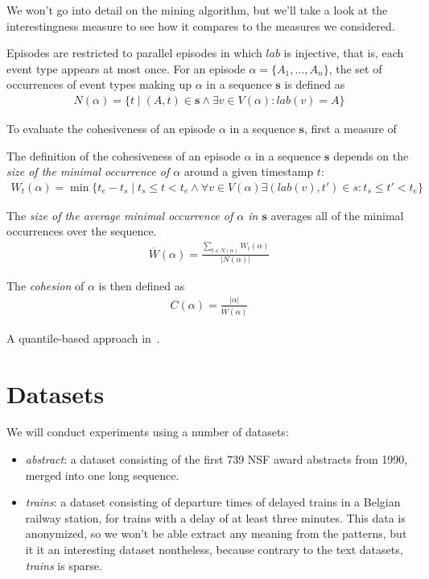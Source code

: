 We won't go into detail on the mining algorithm, but we'll take a look at the interestingness measure to see how it compares to the measures we considered.

Episodes are restricted to parallel episodes in which $ lab $ is injective, that is, each event type appears at most once. For an episode $ \alpha = \{ A_1, \ldots, A_n \} $, the set of occurrences of event types making up $ \alpha $ in a sequence $ \boldsymbol{s} $ is defined as
\begin{align*}
N(\alpha) = \{ t \mid (A, t) \in \boldsymbol{s} \wedge \exists v \in V(\alpha): lab(v) = A \}
\end{align*}


To evaluate the cohesiveness of an episode $ \alpha $ in a sequence $ \boldsymbol{s} $, first a measure of 

The definition of the cohesiveness of an episode $ \alpha $ in a sequence $ \boldsymbol{s} $ depends on the \emph{size of the minimal occurrence of $ \alpha $} around a given timestamp $ t $:
\begin{align*}
W_t(\alpha) = \min\{ t_e - t_s \mid t_s \leq t < t_e \wedge \forall v \in V(\alpha) \exists (lab(v), t') \in s : t_s \leq t' < t_e \}
\end{align*}

The \emph{size of the average minimal occurrence of $ \alpha $ in $ \boldsymbol{s} $} averages all of the minimal occurrences over the sequence.
\begin{align*}
\overline{W}(\alpha) = \frac{\sum_{t \in N(\alpha)} W_t(\alpha)}{| N(\alpha) |}
\end{align*}

The \emph{cohesion} of $ \alpha $ is then defined as
\begin{align*}
C(\alpha) = \frac{| \alpha |}{\overline{W}(\alpha)}
\end{align*}

A quantile-based approach in~\citep{feremans2018mining}.

\section{Datasets}

We will conduct experiments using a number of datasets:

\begin{itemize}
\item \emph{abstract}: a dataset consisting of the first 739 NSF award abstracts from 1990, merged into one long sequence.
\item \emph{trains}: a dataset consisting of departure times of delayed trains in a Belgian railway station, for trains with a delay of at least three minutes. This data is anonymized, so we won't be able extract any meaning from the patterns, but it it an interesting dataset nontheless, because contrary to the text datasets, \emph{trains} is sparse.
\end{itemize}

